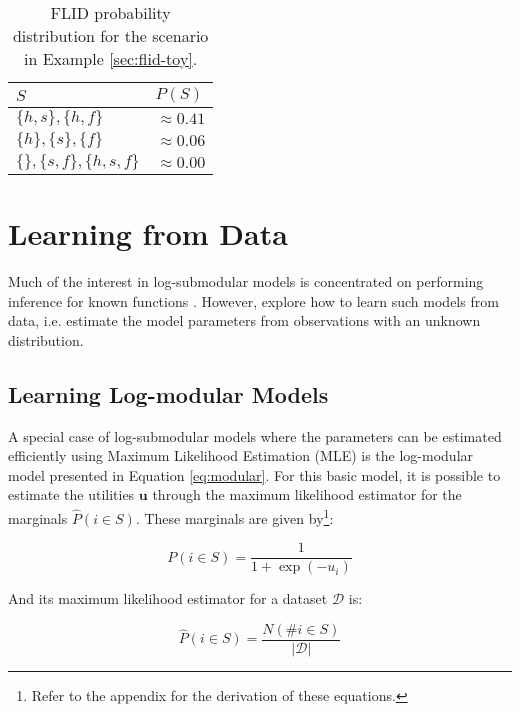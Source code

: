 \begin{table}
  \centering
  \caption{FLID probability distribution for the scenario in Example \ref{sec:flid-toy}.}
  \begin{tabular}{@{}ll@{}}
    \toprule
    $S$ & $P(S)$  \\
    \midrule
    $\{h,s\}, \{h,f\}$ & $\approx 0.41$ \\
    $\{h\}, \{s\}, \{f\}$ & $\approx 0.06$ \\
    $\{\}, \{s,f\}, \{h,s,f\}$ & $\approx 0.00$ \\
    \bottomrule
  \end{tabular}
  \label{tab:flid-toy-probs}
\end{table}

\section{Learning from Data}
\label{sec:learning}

Much of the interest in log-submodular models is concentrated on performing inference for known functions \citep{tschiatschek16learning}. However, \citet{tschiatschek16learning} explore how to learn such models from data, i.e. estimate the model parameters from observations with an unknown distribution.

\subsection{Learning Log-modular Models}
\label{sec:learning_modular}

A special case of log-submodular models where the parameters can be estimated efficiently using Maximum Likelihood Estimation (MLE) is the log-modular model presented in Equation \eqref{eq:modular}. For this basic model, it is possible to estimate the utilities $\mathbf{u}$ through the maximum likelihood estimator for the marginals $\hat{P}(i \in S)$. These marginals are given by\footnote{Refer to the appendix for the derivation of these equations.}:

\begin{equation}
P(i \in S) = \frac{1}{1 + \exp(-u_{i})}
\end{equation}

And its maximum likelihood estimator for a dataset $\mathcal{D}$ is:

\begin{equation}
\hat{P}(i \in S) = \frac{N(\#i \in S)}{|\mathcal{D}|}
\end{equation}

